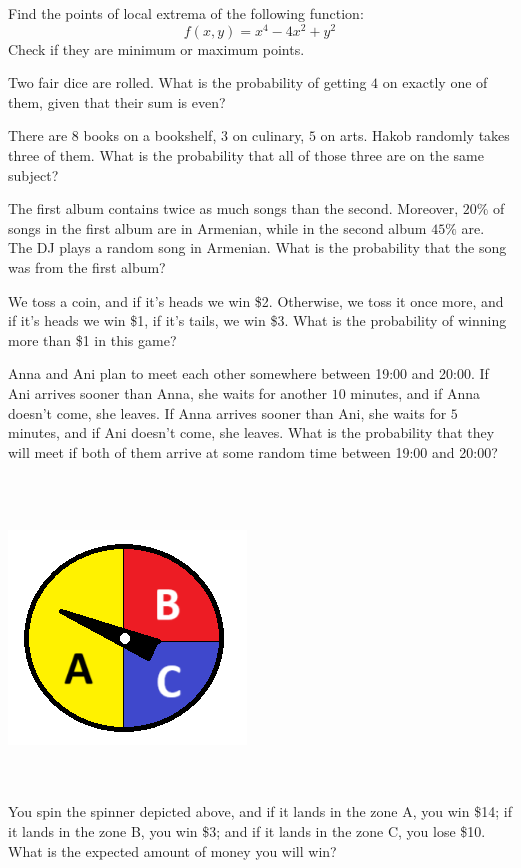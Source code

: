 \begin{problem}
Find the points of local extrema of the following function:
\[f(x, y) = x^4 - 4x^2 + y^2\]
Check if they are minimum or maximum points.
\end{problem}
\medskip



\begin{problem}
Two fair dice are rolled. What is the probability of getting $4$ on exactly one of them, given that their sum is even?
\end{problem}
\medskip


\begin{problem}
There are $8$ books on a bookshelf, $3$ on culinary, $5$ on arts. Hakob randomly takes three of them. What is the probability that all of those three are on the same subject?
\end{problem}
\medskip

\begin{problem}
The first album contains twice as much songs than the second. Moreover, $20\%$ of songs in the first album are in Armenian, while in the second album $45\%$ are. The DJ plays a random song in Armenian. What is the probability that the song was from the first album?
\end{problem}
\medskip


\begin{problem}
We toss a coin, and if it's heads we win \$2. Otherwise, we toss it once more, and if it's heads we win \$1, if it's tails, we win \$3. What is the probability of winning more than \$1 in this game?
\end{problem}
\medskip



\begin{problem}
Anna and Ani plan to meet each other somewhere between 19:00 and 20:00. If Ani arrives sooner than Anna, she waits for another $10$ minutes, and if Anna doesn't come, she leaves. If Anna arrives sooner than Ani, she waits for $5$ minutes, and if Ani doesn't come, she leaves. What is the probability that they will meet if both of them arrive at some random time between 19:00 and 20:00?
\end{problem}
\medskip

\begin{problem}
\\~\\
\begin{center}
    \includegraphics[width=0.2\linewidth]{figs/spinner.png}
\end{center}
\\~\\
You spin the spinner depicted above, and if it lands in the zone A, you win \$14; if it lands in the zone B, you win \$3; and if it lands in the zone C, you lose \$10. What is the expected amount of money you will win? 
\end{problem}
\medskip



